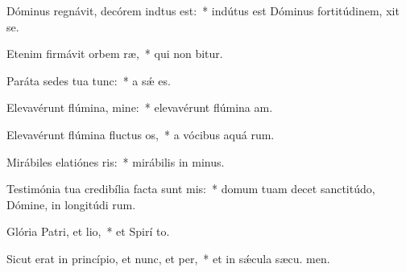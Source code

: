 \item Dóminus regnávit, decórem indtus est:~* indútus est Dóminus fortitúdinem,  xit se.
\item Etenim firmávit orbem ræ,~* qui non bitur.
\item Paráta sedes tua  tunc:~* a sǽ  es.
\item Elevavérunt flúmina, mine:~* elevavérunt flúmina  am.
\item Elevavérunt flúmina fluctus os,~* a vócibus aquá rum.
\item Mirábiles elatiónes ris:~* mirábilis in  minus.
\item Testimónia tua credibília facta sunt mis:~* domum tuam decet sanctitúdo, Dómine, in longitúdi rum.
\item Glória Patri, et lio,~* et Spirí to.
\item Sicut erat in princípio, et nunc, et per,~* et in sǽcula sæcu. men.

